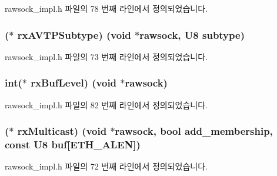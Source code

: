 rawsock\+\_\+impl.\+h 파일의 78 번째 라인에서 정의되었습니다.

\subsubsection[{\texorpdfstring{rx\+A\+V\+T\+P\+Subtype}{rxAVTPSubtype}}]{($\ast$ rx\+A\+V\+T\+P\+Subtype) (void $\ast$rawsock, {\bf U8} subtype)}\hypertarget{structrawsock__cb__t_a0b3fe73f957260501eec27c9b0fb74ae}{}\label{structrawsock__cb__t_a0b3fe73f957260501eec27c9b0fb74ae}


rawsock\+\_\+impl.\+h 파일의 73 번째 라인에서 정의되었습니다.

\subsubsection[{\texorpdfstring{rx\+Buf\+Level}{rxBufLevel}}]{\setlength{\rightskip}{0pt plus 5cm}int($\ast$ rx\+Buf\+Level) (void $\ast$rawsock)}\hypertarget{structrawsock__cb__t_ae53f5e072b7695b093ebd9a709f945b4}{}\label{structrawsock__cb__t_ae53f5e072b7695b093ebd9a709f945b4}


rawsock\+\_\+impl.\+h 파일의 82 번째 라인에서 정의되었습니다.

\subsubsection[{\texorpdfstring{rx\+Multicast}{rxMulticast}}]{($\ast$ rx\+Multicast) (void $\ast$rawsock, {\bf bool} add\+\_\+membership, const {\bf U8} buf\mbox{[}{\bf E\+T\+H\+\_\+\+A\+L\+EN}\mbox{]})}\hypertarget{structrawsock__cb__t_a0683e53a5342e7e7aa9755ffcccb49cb}{}\label{structrawsock__cb__t_a0683e53a5342e7e7aa9755ffcccb49cb}


rawsock\+\_\+impl.\+h 파일의 72 번째 라인에서 정의되었습니다.

